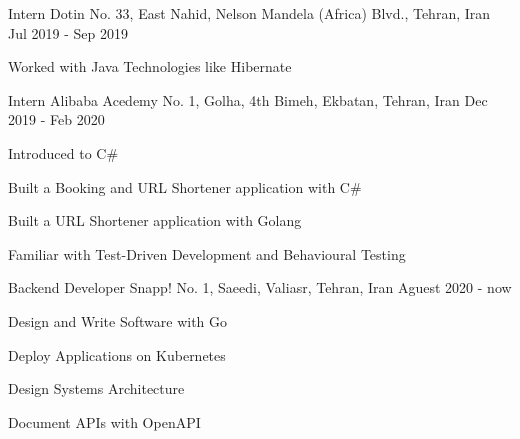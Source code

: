 

\begin{cventries}

  \cventry
    {Intern} %
    {Dotin} %
    {No. 33, East Nahid, Nelson Mandela (Africa) Blvd., Tehran, Iran} %
    {Jul 2019 - Sep 2019} %
    {
      \begin{cvitems} %
        \item {Worked with Java Technologies like Hibernate}
      \end{cvitems}
    }

  \cventry
    {Intern} %
    {Alibaba Acedemy} %
    {No. 1, Golha, 4th Bimeh, Ekbatan, Tehran, Iran} %
    {Dec 2019 - Feb 2020} %
    {
      \begin{cvitems} %
        \item {Introduced to C\#}
        \item {Built a Booking and URL Shortener application with C\#}
        \item {Built a URL Shortener application with Golang}
        \item {Familiar with Test-Driven Development and Behavioural Testing}
      \end{cvitems}
    }
    
  \cventry
    {Backend Developer} %
    {Snapp!} %
    {No. 1, Saeedi, Valiasr, Tehran, Iran} %
    {Aguest 2020 - now} %
    {
      \begin{cvitems} %
        \item {Design and Write Software with Go}
        \item {Deploy Applications on Kubernetes}
        \item {Design Systems Architecture}
        \item {Document APIs with OpenAPI}
      \end{cvitems}
    }

\end{cventries}

